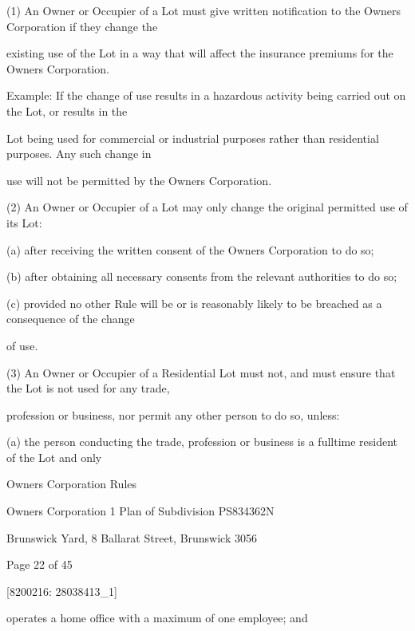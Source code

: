 \documentclass{article}
\begin{document}
{\fontsize{9.962}{1}(1) An Owner or Occupier of a Lot must give written notification to the Owners Corporation if they change the }

{\fontsize{10.02}{1}existing use of the Lot in a way that will affect the insurance premiums for the Owners Corporation. }

{\fontsize{10.02}{1}Example: If the change of use results in a hazardous activity being carried out on the Lot, or results in the }

{\fontsize{10.02}{1}Lot being used for commercial or industrial purposes rather than residential purposes. Any such change in }

{\fontsize{10.02}{1}use will not be permitted by the Owners Corporation. }

{\fontsize{9.962}{1}(2) An Owner or Occupier of a Lot may only change the original permitted use of its Lot: }

{\fontsize{9.962}{1}(a) after receiving the written consent of the Owners Corporation to do so; }

{\fontsize{9.962}{1}(b) after obtaining all necessary consents from the relevant authorities to do so; }

{\fontsize{9.962}{1}(c) provided no other Rule will be or is reasonably likely to be breached as a consequence of the change }

{\fontsize{10.02}{1}of use. }

{\fontsize{9.962}{1}(3) An Owner or Occupier of a Residential Lot must not, and must ensure that the Lot is not used for any trade, }

{\fontsize{10.02}{1}profession or business, nor permit any other person to do so, unless: }

{\fontsize{9.962}{1}(a) the person conducting the trade, profession or business is a fulltime resident of the Lot and only }

\newpage





{\fontsize{9}{1}Owners Corporation Rules }

{\fontsize{9}{1}Owners Corporation 1 Plan of Subdivision PS834362N }

{\fontsize{9}{1}Brunswick Yard, 8 Ballarat Street, Brunswick 3056 }


{\fontsize{9}{1}Page 22  of 45 }



{\fontsize{7.02}{1}[8200216: 28038413\_1] }

{\fontsize{10.02}{1}operates a home office with a maximum of one employee; and }
\end{document}
